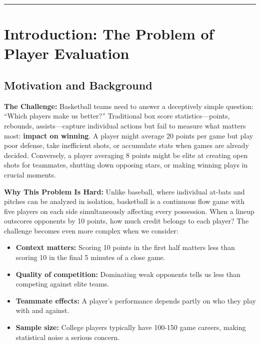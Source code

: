 \documentclass[
  letterpaper,
  DIV=11,
  numbers=noendperiod]{scrartcl}
\providecommand{\tightlist}{%
  \setlength{\itemsep}{0pt}\setlength{\parskip}{0pt}}
\begin{document}
\begin{center}\rule{0.5\linewidth}{0.5pt}\end{center}

\section{Introduction: The Problem of Player
Evaluation}\label{introduction-the-problem-of-player-evaluation}

\subsection{Motivation and Background}\label{motivation-and-background}

\textbf{The Challenge:} Basketball teams need to answer a deceptively
simple question: ``Which players make us better?'' Traditional box score
statistics---points, rebounds, assists---capture individual actions but
fail to measure what matters most: \textbf{impact on winning}. A player
might average 20 points per game but play poor defense, take inefficient
shots, or accumulate stats when games are already decided. Conversely, a
player averaging 8 points might be elite at creating open shots for
teammates, shutting down opposing stars, or making winning plays in
crucial moments.

\textbf{Why This Problem Is Hard:} Unlike baseball, where individual
at-bats and pitches can be analyzed in isolation, basketball is a
continuous flow game with five players on each side simultaneously
affecting every possession. When a lineup outscores opponents by 10
points, how much credit belongs to each player? The challenge becomes
even more complex when we consider:

\begin{itemize}
\tightlist
\item
  \textbf{Context matters:} Scoring 10 points in the first half matters
  less than scoring 10 in the final 5 minutes of a close game.
\item
  \textbf{Quality of competition:} Dominating weak opponents tells us
  less than competing against elite teams.
\item
  \textbf{Teammate effects:} A player's performance depends partly on
  who they play with and against.
\item
  \textbf{Sample size:} College players typically have 100-150 game
  careers, making statistical noise a serious concern.
\end{itemize}
\end{document}
